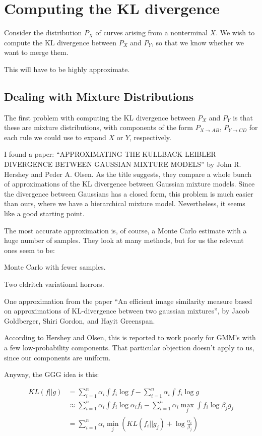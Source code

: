\documentclass{article}
\begin{document}
\section{Computing the KL divergence}

Consider the distribution $P_X$ of curves arising from a nonterminal
$X$.  We wish to compute the KL divergence between $P_X$ and $P_Y$, so
that we know whether we want to merge them.

This will have to be highly approximate.

\subsection{Dealing with Mixture Distributions}

The first problem with computing the KL divergence between $P_X$ and
$P_Y$ is that these are mixture distributions, with components of the
form $P_{X\to AB}$, $P_{Y\to CD}$ for each rule we could use to expand
$X$ or $Y$, respectively.

I found a paper: ``APPROXIMATING THE KULLBACK LEIBLER DIVERGENCE
BETWEEN GAUSSIAN MIXTURE MODELS'' by John R. Hershey and Peder
A. Olsen. As the title suggests, they compare a whole bunch of
approximations of the KL divergence between Gaussian mixture
models. Since the divergence between Gaussians has a closed form, this
problem is much easier than ours, where we have a hierarchical mixture
model. Nevertheless, it seems like a good starting point.

The most accurate approximation is, of course, a Monte Carlo estimate
with a huge number of samples. They look at many methods, but for us
the relevant ones seem to be:

\bitem
\item Monte Carlo with fewer samples. 
\item Two eldritch variational horrors.
\item One approximation from the paper ``An efficient image similarity
  measure based on approximations of KL-divergence between two
  gaussian mixtures'', by Jacob Goldberger, Shiri Gordon, and Hayit
  Greenspan.

  According to Hershey and Olsen, this is reported to work poorly for
  GMM's with a few low-probability components. That particular
  objection doesn't apply to us, since our components are uniform.
\eitem

Anyway, the GGG idea is this:

\begin{align*}
KL(f || g) &= \sum_{i=1}^n \alpha_i \int f_i \log f - \sum_{i=1}^n \alpha_i \int f_i \log g\\
&\approx \sum_{i=1}^n \alpha_i \int f_i \log \alpha_i f_i - \sum_{i=1}^n \alpha_i \max_j \int f_i \log \beta_j g_j\\
&= \sum_{i=1}^n \alpha_i \min_j \left( KL(f_i || g_j) + \log \frac{\alpha_i}{\beta_j} \right)
\end{align*}
\end{document}
